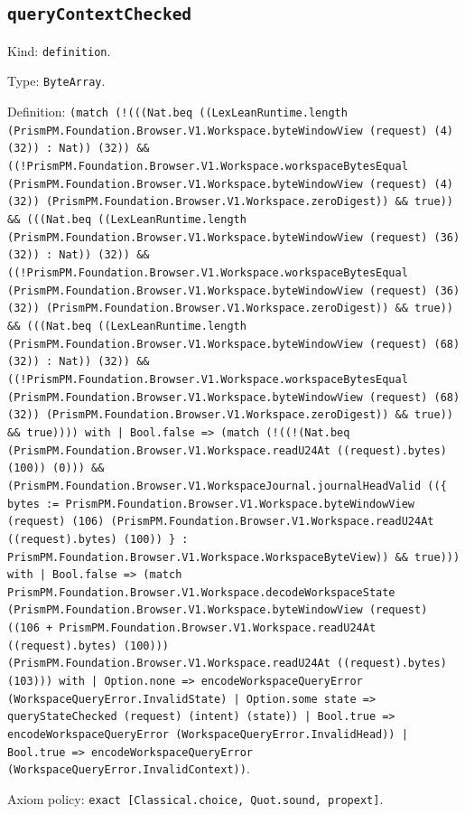 \documentclass[11pt]{article}
\begin{document}
\subsection*{\texttt{queryContextChecked}}
\noindent Kind: \texttt{definition}.\par
\noindent Type: \texttt{ByteArray}.\par
\noindent Definition: \texttt{(match (!(((Nat.beq ((LexLeanRuntime.length (PrismPM.Foundation.Browser.V1.Workspace.byteWindowView (request) (4) (32)) : Nat)) (32)) \&\& ((!PrismPM.Foundation.Browser.V1.Workspace.workspaceBytesEqual (PrismPM.Foundation.Browser.V1.Workspace.byteWindowView (request) (4) (32)) (PrismPM.Foundation.Browser.V1.Workspace.zeroDigest)) \&\& true)) \&\& (((Nat.beq ((LexLeanRuntime.length (PrismPM.Foundation.Browser.V1.Workspace.byteWindowView (request) (36) (32)) : Nat)) (32)) \&\& ((!PrismPM.Foundation.Browser.V1.Workspace.workspaceBytesEqual (PrismPM.Foundation.Browser.V1.Workspace.byteWindowView (request) (36) (32)) (PrismPM.Foundation.Browser.V1.Workspace.zeroDigest)) \&\& true)) \&\& (((Nat.beq ((LexLeanRuntime.length (PrismPM.Foundation.Browser.V1.Workspace.byteWindowView (request) (68) (32)) : Nat)) (32)) \&\& ((!PrismPM.Foundation.Browser.V1.Workspace.workspaceBytesEqual (PrismPM.Foundation.Browser.V1.Workspace.byteWindowView (request) (68) (32)) (PrismPM.Foundation.Browser.V1.Workspace.zeroDigest)) \&\& true)) \&\& true)))) with | Bool.false => (match (!((!(Nat.beq (PrismPM.Foundation.Browser.V1.Workspace.readU24At ((request).bytes) (100)) (0))) \&\& (PrismPM.Foundation.Browser.V1.WorkspaceJournal.journalHeadValid ((\{ bytes := PrismPM.Foundation.Browser.V1.Workspace.byteWindowView (request) (106) (PrismPM.Foundation.Browser.V1.Workspace.readU24At ((request).bytes) (100)) \} : PrismPM.Foundation.Browser.V1.Workspace.WorkspaceByteView)) \&\& true))) with | Bool.false => (match PrismPM.Foundation.Browser.V1.Workspace.decodeWorkspaceState (PrismPM.Foundation.Browser.V1.Workspace.byteWindowView (request) ((106 + PrismPM.Foundation.Browser.V1.Workspace.readU24At ((request).bytes) (100))) (PrismPM.Foundation.Browser.V1.Workspace.readU24At ((request).bytes) (103))) with | Option.none => encodeWorkspaceQueryError (WorkspaceQueryError.InvalidState) | Option.some state => queryStateChecked (request) (intent) (state)) | Bool.true => encodeWorkspaceQueryError (WorkspaceQueryError.InvalidHead)) | Bool.true => encodeWorkspaceQueryError (WorkspaceQueryError.InvalidContext))}.\par
\noindent Axiom policy: \texttt{exact [Classical.choice, Quot.sound, propext]}.\par
\end{document}
